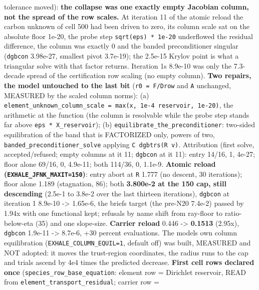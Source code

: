 \documentclass[english,a4paper]{my_memo}
\begin{document}
\begin{itemize}
  tolerance moved): \textbf{the collapse was one exactly empty Jacobian column,
  not the spread of the row scales.} At iteration 11 of the atomic reload
  the carbon unknown of cell 500 had been driven to zero, its column scale
  sat on the absolute floor 1e-20, the probe step \texttt{sqrt(eps)\ *\ 1e-20}
  underflowed the residual difference, the column was exactly 0 and the
  banded preconditioner singular (\texttt{dgbcon} 3.98e-27, smallest pivot
  3.7e-19); the 2.5e-15 Krylov point is what a triangular solve with that
  factor returns. Iteration 1\textquotesingle s 8.9e-10 was only the 7.3-decade spread of
  the certification row scaling (no empty column). \textbf{Two repairs, the model
  untouched to the last bit} (\texttt{r0\ =\ F/Drow} and \texttt{A} unchanged, MEASURED by
  the scaled column norms): (a) \texttt{element\_unknown\_column\_scale\ =\ max(\textbar{}x\textbar{},\ 1e-4\ \textbar{}reservoir\textbar{},\ 1e-20)}, the arithmetic at the function (the column is
  resolvable while the probe step stands far above \texttt{eps\ *\ X\_reservoir});
  (b) \texttt{equilibrate\_the\_preconditioner}: two-sided equilibration of the band
  that is FACTORIZED only, powers of two, \texttt{banded\_preconditioner\_solve}
  applying \texttt{C\ dgbtrs(R\ v)}. Attribution (first solve, accepted/refused;
  empty columns at it 11; \texttt{dgbcon} at it 11): entry 14/16, 1, 4e-27; floor
  alone 69/16, 0, 4.9e-11; both 114/36, 0, 1.1e-9. \textbf{Atomic reload
  (\texttt{EXHALE\_JFNK\_MAXIT=150})}: entry abort at \texttt{\textbar{}\textbar{}R\textbar{}\textbar{}} 1.777 (no descent, 30
  iterations); floor alone 1.189 (stagnation, 86); both \textbf{3.800e-2 at the
  150 cap, still descending} (2.5e-1 to 3.8e-2 over the last thirteen
  iterations), \texttt{dgbcon} at iteration 1 8.9e-10 -\textgreater{} 1.65e-6, the brief\textquotesingle s
  target (the pre-N20 7.4e-2) passed by 1.94x with one functional kept;
  refusals by name shift from ray-floor to ratio-below-eta (35) and one
  slope-size. \textbf{Carrier reload} 0.446 -\textgreater{} \textbf{0.1513} (2.95x), \texttt{dgbcon}
  1.9e-11 -\textgreater{} 8.7e-6, +30 percent evaluations. The model\textquotesingle s own column
  equilibration (\texttt{EXHALE\_COLUMN\_EQUIL=1}, default off) was built, MEASURED
  and NOT adopted: it moves the trust-region coordinates, the radius runs
  to the cap and trials ascend by 4e4 times the predicted decrease. \textbf{First
  cell rows declared once} (\texttt{species\_row\_base\_equation}: element row =
  Dirichlet reservoir, READ from \texttt{element\_transport\_residual}; carrier row =

\end{itemize}
\end{document}
